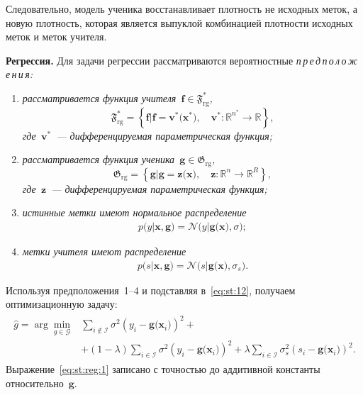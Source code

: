 \documentclass{dissert}
\newcommand{\paragraph}[1]{\noindent\textbf{#1}\quad}
\begin{document}
Следовательно, модель ученика восстанавливает плотность не исходных меток, а новую плотность, которая является выпуклой комбинацией плотности исходных меток и меток учителя.

\paragraph{Регрессия.} Для задачи регрессии рассматриваются вероятностные \emph{п\,р\,е\,д\,п\,о\,л\,о\,ж\,е\,н\,и\,я:}

\begin{enumerate}[1)]
	\item \emph{рассматривается функция учителя~$\mathbf{f}\in\mathfrak{F}_{\text{rg}}^{*}$,
	\[
	\mathfrak{F}_{\text{rg}}^* = \left\{\mathbf{f}| \mathbf{f} = \mathbf{v}^*\bigr(\mathbf{x}^*\bigr), \quad \mathbf{v}^*: \mathbb{R}^{n^*} \to \mathbb{R} \right\},
	\]
	где~$\mathbf{v}^*$~--- дифференцируемая параметрическая функция;}
	\item \emph{рассматривается функция ученика~$\mathbf{g}\in\mathfrak{G}_{\text{rg}}$,
    \[
    \mathfrak{G}_{\text{rg}} = \left\{\mathbf{g}| \mathbf{g} = \mathbf{z}\bigr(\mathbf{x}\bigr), \quad \mathbf{z}: \mathbb{R}^n \to \mathbb{R}^R \right\},
    \]
    где~$\mathbf{z}$~--- дифференцируемая параметрическая функция;}
	\item \emph{истинные метки имеют нормальное распределение
	\begin{gather}
		p\bigr(y|\mathbf{x}, \mathbf{g}\bigr) = \mathcal{N}\bigr(y|\mathbf{g}\bigr(\mathbf{x}\bigr), \sigma\bigr);
	\end{gather}}
	\item \emph{метки учителя имеют распределение
	\begin{gather}
		p\bigr(s| \mathbf{x}, \mathbf{g}\bigr) = \mathcal{N}\bigr(s|\mathbf{g}\bigr(\mathbf{x}\bigr), \sigma_s\bigr).
	\end{gather}}
\end{enumerate}
Используя предположения~1--4 и подставляя в~\eqref{eq:st:12}, получаем оптимизационную задачу:
\begin{gather}
\label{eq:st:reg:1}
\begin{aligned}
\hat{g} = \arg\min_{g\in \mathcal{G}} & \sum_{i\not\in \mathcal{I}}\sigma^2\left(y_i-\mathbf{g}\bigr(\mathbf{x}_i\bigr)\right)^2 +\\
&+ \left(1-\lambda\right)\sum_{i\in \mathcal{I}}\sigma^2\left(y_i-\mathbf{g}\bigr(\mathbf{x}_i\bigr)\right)^2 + \lambda\sum_{i\in \mathcal{I}}\sigma_s^2\left(s_i-\mathbf{g}\bigr(\mathbf{x}_i\bigr)\right)^2.
\end{aligned}
\end{gather}
Выражение~\eqref{eq:st:reg:1} записано с точностью до аддитивной константы относительно~$\mathbf{g}$. 
\end{document}
